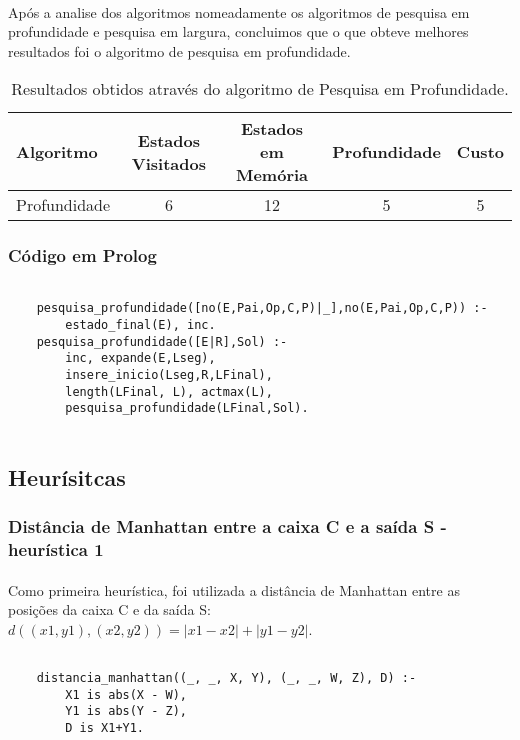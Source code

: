 \documentclass{article}
\begin{document}
\paragraph{} Após a analise dos algoritmos nomeadamente os algoritmos de pesquisa em profundidade e pesquisa em largura, concluimos que o que obteve melhores resultados foi o algoritmo de pesquisa em profundidade.
\begin{table}[h]
\centering
\begin{tabular}{l|c|c|c|c}
Algoritmo & Estados Visitados & Estados em Memória & Profundidade & Custo \\\hline
Profundidade & 6 & 12 & 5 & 5  
\end{tabular}
\caption{\label{tab:pni}Resultados obtidos através do algoritmo de Pesquisa em Profundidade.}
\end{table}

\subsubsection{Código em Prolog}
\begin{verbatim}

    pesquisa_profundidade([no(E,Pai,Op,C,P)|_],no(E,Pai,Op,C,P)) :- 
        estado_final(E), inc.
    pesquisa_profundidade([E|R],Sol) :- 
        inc, expande(E,Lseg),
        insere_inicio(Lseg,R,LFinal),
        length(LFinal, L), actmax(L),
        pesquisa_profundidade(LFinal,Sol).
        
\end{verbatim}

\subsection{Heurísitcas}
\subsubsection{Distância de Manhattan entre a caixa C e a saída S - heurística 1}
\paragraph{} Como primeira heurística, foi utilizada a distância de Manhattan entre as posições da caixa C e da saída S: $d((x1, y1), (x2, y2)) = |x1 - x2| + |y1 - y2|$.

\begin{verbatim}

    distancia_manhattan((_, _, X, Y), (_, _, W, Z), D) :-
        X1 is abs(X - W),
        Y1 is abs(Y - Z),
        D is X1+Y1.
        
\end{verbatim}
\end{document}
